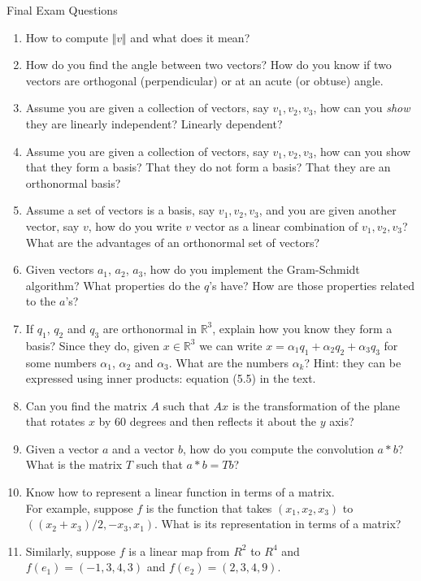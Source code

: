 \documentclass[11pt,fleqn]{article}
\newcommand{\Reals}{\mathbb{R}}
\begin{document}
\begin{center}{\Large{Final Exam Questions}}\end{center}

		\begin{enumerate}
		\item How to compute $\Vert v \Vert$ and what does it mean?
		\item How do you find the angle between two vectors? How do you know if two vectors are orthogonal (perpendicular) or at an acute (or obtuse) angle.
		\item Assume you are given a collection of vectors, say $v_1, v_2, v_3$, how can you \emph{show} they are linearly independent? Linearly dependent? 
		\item Assume you are given a collection of vectors, say $v_1, v_2, v_3$, how can you show that they form a basis? That they do not form a basis? That they are an orthonormal basis?
		\item Assume a set of vectors is a basis, say $v_1, v_2, v_3$, and you are given another vector, say $v$, how do you write $v$ vector as a linear combination of $v_1, v_2, v_3$? What are the advantages of an orthonormal set of vectors?
		\item Given vectors $a_1$, $a_2$, $a_3$, how do you implement the Gram-Schmidt algorithm?  What properties do the $q$'s have? How are those properties related to the $a$'s?
		\item If $q_1$, $q_2$ and $q_3$ are orthonormal in $\Reals^3$, explain how you know they form a basis?  Since they do, given
$x\in\Reals^3$ we can write $x = \alpha_1 q_1+\alpha_2 q_2+ \alpha_3 q_3$
for some numbers $\alpha_1$, $\alpha_2$ and $\alpha_3$.  What are the numbers
$\alpha_k$?  Hint: they can be expressed using inner products: equation (5.5) in the text.	
	\item Can you find the matrix $A$ such that $Ax$  is the transformation of the plane that rotates $x$ by 60 degrees and then reflects it about the $y$ axis?
	\item Given a vector $a$ and a vector $b$, how do you compute the convolution $a*b$?
What is the matrix $T$ such that $a*b = Tb$?
\item Know how to represent a linear function in terms of a matrix.\\  
For example, suppose $f$ is the function that takes $(x_1, x_2, x_3)$ to $((x_2+x_3)/2,-x_3, x_1)$.
What is its representation in terms of a matrix?  
\item Similarly, suppose 
$f$ is a linear map from $R^2$ to $R^4$ and $f(e_1) = (-1, 3, 4, 3)$ and $f(e_2) = (2 , 3, 4, 9)$.

\end{enumerate}
\end{document}

